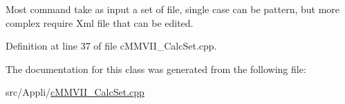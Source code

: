 Most command take as input a set of file, single case can be pattern, but more complex require Xml file that can be edited. 

Definition at line 37 of file c\+M\+M\+V\+I\+I\+\_\+\+Calc\+Set.\+cpp.



The documentation for this class was generated from the following file\+:\begin{DoxyCompactItemize}
\item 
src/\+Appli/\hyperlink{cMMVII__CalcSet_8cpp}{c\+M\+M\+V\+I\+I\+\_\+\+Calc\+Set.\+cpp}\end{DoxyCompactItemize}
